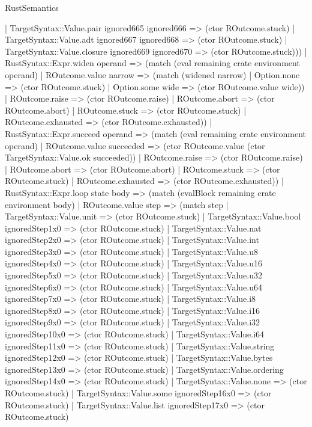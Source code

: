 \begin{lexlean}{RustSemantics}
\begin{semanticmodule}
{          | TargetSyntax::Value.pair ignored665 ignored666 => (ctor ROutcome.stuck)
          | TargetSyntax::Value.adt ignored667 ignored668 => (ctor ROutcome.stuck)
          | TargetSyntax::Value.closure ignored669 ignored670 => (ctor ROutcome.stuck)))
      | RustSyntax::Expr.widen operand => (match (eval remaining crate environment operand)
        | ROutcome.value narrow => (match (widened narrow)
          | Option.none => (ctor ROutcome.stuck)
          | Option.some wide => (ctor ROutcome.value wide))
        | ROutcome.raise => (ctor ROutcome.raise)
        | ROutcome.abort => (ctor ROutcome.abort)
        | ROutcome.stuck => (ctor ROutcome.stuck)
        | ROutcome.exhausted => (ctor ROutcome.exhausted))
      | RustSyntax::Expr.succeed operand => (match (eval remaining crate environment operand)
        | ROutcome.value succeeded => (ctor ROutcome.value (ctor TargetSyntax::Value.ok succeeded))
        | ROutcome.raise => (ctor ROutcome.raise)
        | ROutcome.abort => (ctor ROutcome.abort)
        | ROutcome.stuck => (ctor ROutcome.stuck)
        | ROutcome.exhausted => (ctor ROutcome.exhausted))
      | RustSyntax::Expr.loop state body => (match (evalBlock remaining crate environment body)
        | ROutcome.value step => (match step
          | TargetSyntax::Value.unit => (ctor ROutcome.stuck)
          | TargetSyntax::Value.bool ignoredStep1x0 => (ctor ROutcome.stuck)
          | TargetSyntax::Value.nat ignoredStep2x0 => (ctor ROutcome.stuck)
          | TargetSyntax::Value.int ignoredStep3x0 => (ctor ROutcome.stuck)
          | TargetSyntax::Value.u8 ignoredStep4x0 => (ctor ROutcome.stuck)
          | TargetSyntax::Value.u16 ignoredStep5x0 => (ctor ROutcome.stuck)
          | TargetSyntax::Value.u32 ignoredStep6x0 => (ctor ROutcome.stuck)
          | TargetSyntax::Value.u64 ignoredStep7x0 => (ctor ROutcome.stuck)
          | TargetSyntax::Value.i8 ignoredStep8x0 => (ctor ROutcome.stuck)
          | TargetSyntax::Value.i16 ignoredStep9x0 => (ctor ROutcome.stuck)
          | TargetSyntax::Value.i32 ignoredStep10x0 => (ctor ROutcome.stuck)
          | TargetSyntax::Value.i64 ignoredStep11x0 => (ctor ROutcome.stuck)
          | TargetSyntax::Value.string ignoredStep12x0 => (ctor ROutcome.stuck)
          | TargetSyntax::Value.bytes ignoredStep13x0 => (ctor ROutcome.stuck)
          | TargetSyntax::Value.ordering ignoredStep14x0 => (ctor ROutcome.stuck)
          | TargetSyntax::Value.none => (ctor ROutcome.stuck)
          | TargetSyntax::Value.some ignoredStep16x0 => (ctor ROutcome.stuck)
          | TargetSyntax::Value.list ignoredStep17x0 => (ctor ROutcome.stuck)
}
\end{semanticmodule}
\end{lexlean}
